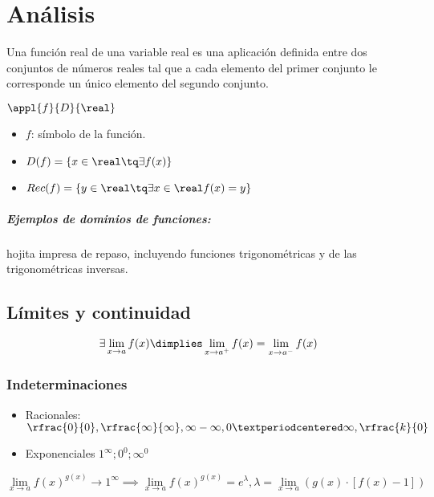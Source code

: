 
\chapter{Análisis}

\begin{defn}
Una función real de una variable real es una aplicación definida entre dos conjuntos de números reales tal que a cada elemento del primer conjunto le corresponde un único elemento del segundo conjunto.

$\appl{f}{D}{\real}$

\begin{itemize}
	\item $f$: símbolo de la función.
	\item $D(f) = \{x\in\real \tq \exists f(x)\}$
	\item $Rec(f) = \{y\in\real \tq \exists x \in\real f(x)=y\}$
\end{itemize}
\end{defn}

\paragraph{Ejemplos de dominios de funciones:} hojita impresa de repaso, incluyendo funciones trigonométricas y de las trigonométricas inversas.

\section{Límites y continuidad}

\begin{theorem}
\[\exists \lim_{x\to a}f(x) \dimplies \lim_{x\to a^+} f(x) = \lim_{x\to a^-}f(x)\]
\end{theorem}

\subsection{Indeterminaciones}

\begin{itemize}
	\item Racionales: $\rfrac{0}{0},\rfrac{\infty}{\infty},\infty-\infty,0·\infty, \rfrac{k}{0}$
	\item Exponenciales $1^{\infty}; 0^0; \infty^0$
\end{itemize}


\begin{prop}
\[
\lim_{x\to a}f(x)^{g(x)} \to 1^{\infty} \implies \lim_{x\to a}f(x)^{g(x)} = e^\lambda, \lambda = \lim_{x\to a} \left(g(x)·[f(x)-1]\right)
\]
\end{prop}

